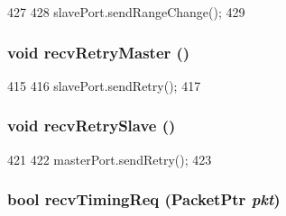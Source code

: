 \begin{DoxyCode}
427 {
428     slavePort.sendRangeChange();
429 }
\end{DoxyCode}
\hypertarget{classCommMonitor_a74fc0d5bf99b08c9899269e3dd7fab6a}{
\subsubsection[{recvRetryMaster}]{\setlength{\rightskip}{0pt plus 5cm}void recvRetryMaster ()}}
\label{classCommMonitor_a74fc0d5bf99b08c9899269e3dd7fab6a}



\begin{DoxyCode}
415 {
416     slavePort.sendRetry();
417 }
\end{DoxyCode}
\hypertarget{classCommMonitor_a2292f62803fe220e9629886f24aae91a}{
\subsubsection[{recvRetrySlave}]{\setlength{\rightskip}{0pt plus 5cm}void recvRetrySlave ()}}
\label{classCommMonitor_a2292f62803fe220e9629886f24aae91a}



\begin{DoxyCode}
421 {
422     masterPort.sendRetry();
423 }
\end{DoxyCode}
\hypertarget{classCommMonitor_a3344d9dd0f83257feab5424e761f31c6}{
\subsubsection[{recvTimingReq}]{\setlength{\rightskip}{0pt plus 5cm}bool recvTimingReq ({\bf PacketPtr} {\em pkt})}}
\label{classCommMonitor_a3344d9dd0f83257feab5424e761f31c6}



